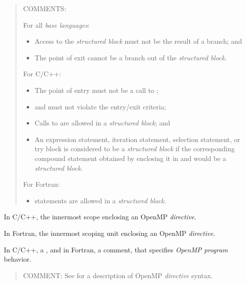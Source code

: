 \begin{quote}
COMMENTS:

For all \emph{base languages}:

\begin{itemize}
\item Access to the \emph{structured block} must not be the result of a branch; and

\item The point of exit cannot be a branch out of the \emph{structured block}.
\end{itemize}

For C/C++:

\begin{itemize}
\item The point of entry must not be a call to ;

\item {} and  must not violate the entry/exit criteria;

\item Calls to  are allowed in a \emph{structured block}; and

\item An expression statement, iteration statement, selection statement, 
or try block is considered to be a \emph{structured block} if the 
corresponding compound statement obtained by enclosing it in \code{\{} 
and \code{\}} would be a \emph{structured block}.
\end{itemize}

For Fortran:

\begin{itemize}
\item {} statements are allowed in a \emph{structured block}.
\end{itemize}
\end{quote}
\glossarydefend


\glossarydefstart
In C/C++, the innermost scope enclosing an OpenMP \emph{directive}.

In Fortran, the innermost scoping unit enclosing an OpenMP \emph{directive}.
\glossarydefend

\glossarydefstart
In C/C++, a , and in Fortran, a comment, that specifies \emph{OpenMP
program} behavior.

\begin{quote}
COMMENT: See  for a description of OpenMP \emph{directive} syntax.
\end{quote}
\glossarydefend


